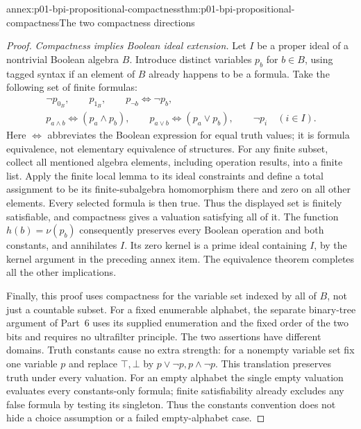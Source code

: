 \begin{annexitem}{annex:p01-bpi-propositional-compactness}{thm:p01-bpi-propositional-compactness}{The two compactness directions}
\begin{proof}
\emph{Compactness implies Boolean ideal extension.} Let \(I\) be a
proper ideal of a nontrivial Boolean algebra \(B\). Introduce distinct
variables \(p_b\) for \(b\in B\), using tagged syntax if an element
of \(B\) already happens to be a formula. Take the following set of
finite formulas:
\[
\begin{gathered}
 \neg p_{0_B},\qquad p_{1_B},\qquad
 p_{\neg b}\Leftrightarrow\neg p_b,\\
 p_{a\wedge b}\Leftrightarrow(p_a\land p_b),\qquad
 p_{a\vee b}\Leftrightarrow(p_a\lor p_b),\qquad
 \neg p_i\quad(i\in I).
\end{gathered}
\]
Here \(\Leftrightarrow\) abbreviates the Boolean expression for equal
truth values; it is formula equivalence, not elementary equivalence of
structures. For any finite subset, collect all mentioned algebra
elements, including operation results, into a finite list. Apply the
finite local lemma to its ideal constraints and define a total assignment
to be its finite-subalgebra homomorphism there and zero on all other
elements. Every selected formula is then true. Thus the displayed set is
finitely satisfiable, and compactness gives a valuation satisfying all
of it. The function \(h(b)=\nu(p_b)\) consequently preserves every
Boolean operation and both constants, and annihilates \(I\). Its
zero kernel is a prime ideal containing \(I\), by the kernel argument
in the preceding annex item. The equivalence theorem completes all the
other implications.

Finally, this proof uses compactness for the variable set indexed by all
of \(B\), not just a countable subset. For a fixed enumerable alphabet,
the separate binary-tree argument of Part~6 uses its supplied enumeration
and the fixed order of the two bits and requires no ultrafilter principle.
The two assertions have different domains. Truth constants cause no
extra strength: for a nonempty variable set fix one variable \(p\)
and replace \(\top,\bot\) by \(p\lor\neg p,p\land\neg p\).
This translation preserves truth under every valuation. For an empty
alphabet the single empty valuation evaluates every constants-only
formula; finite satisfiability already excludes any false formula by
testing its singleton. Thus the constants convention does not hide a
choice assumption or a failed empty-alphabet case.
\end{proof}
\end{annexitem}

